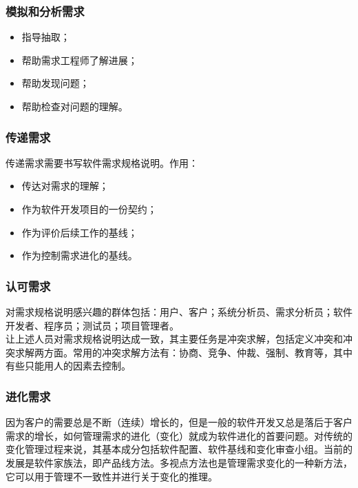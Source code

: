 \documentclass[UTF8,nofonts]{ctexart}
\begin{document}
\subsubsection{\textbf{模拟和分析需求}}
\begin{itemize}
 \setlength{\itemsep}{0pt}
 \setlength{\parskip}{0pt}
 \setlength{\parsep}{0pt}
\item 指导抽取；
\item 帮助需求工程师了解进展；
\item 帮助发现问题；
\item 帮助检查对问题的理解。
\end{itemize}
\subsubsection{\textbf{传递需求}}传递需求需要书写软件需求规格说明。作用：
\begin{itemize}
 \setlength{\itemsep}{0pt}
 \setlength{\parskip}{0pt}
 \setlength{\parsep}{0pt}
\item 传达对需求的理解；
\item 作为软件开发项目的一份契约；
\item 作为评价后续工作的基线；
\item 作为控制需求进化的基线。
\end{itemize}
\subsubsection{\textbf{认可需求}}
对需求规格说明感兴趣的群体包括：用户、客户；系统分析员、需求分析员；软件开发者、程序员；测试员；项目管理者。\\
让上述人员对需求规格说明达成一致，其主要任务是冲突求解，包括定义冲突和冲突求解两方面。常用的冲突求解方法有：协商、竞争、仲裁、强制、教育等，其中有些只能用人的因素去控制。
\subsubsection{\textbf{进化需求}}
因为客户的需要总是不断（连续）增长的，但是一般的软件开发又总是落后于客户需求的增长，如何管理需求的进化（变化）就成为软件进化的首要问题。对传统的变化管理过程来说，其基本成分包括软件配置、软件基线和变化审查小组。当前的发展是软件家族法，即产品线方法。多视点方法也是管理需求变化的一种新方法，它可以用于管理不一致性并进行关于变化的推理。
\end{document}
